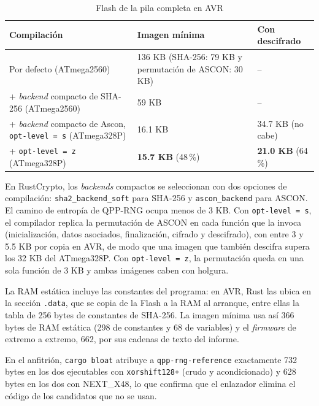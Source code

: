 \begin{table}[H]
\centering
\caption{Flash de la pila completa en AVR}
\label{tab:res_huella_avr}
\small
\begin{tabularx}{\textwidth}{@{}>{\raggedright\arraybackslash}XL{0.27\textwidth}L{0.24\textwidth}@{}}
\toprule
\textbf{Compilación} & \textbf{Imagen mínima} & \textbf{Con descifrado} \\
\midrule
Por defecto (ATmega2560) & 136 KB (SHA-256: 79 KB y permutación de ASCON: 30 KB) & -- \\
+ \textit{backend} compacto de SHA-256 (ATmega2560) & 59 KB & -- \\
+ \textit{backend} compacto de Ascon, \texttt{opt-level = \textquotedbl{}s\textquotedbl{}} (ATmega328P) & 16.1 KB & 34.7 KB (no cabe) \\
+ \texttt{opt-level = \textquotedbl{}z\textquotedbl{}} (ATmega328P) & \textbf{15.7 KB} (48\,\%) & \textbf{21.0 KB} (64\,\%) \\
\bottomrule
\end{tabularx}
\end{table}

En RustCrypto, los \textit{backends} compactos se seleccionan con dos opciones de compilación: \texttt{sha2\_backend\_soft} para SHA-256 y \texttt{ascon\_backend} para ASCON. El camino de entropía de QPP-RNG ocupa menos de 3 KB. Con \texttt{opt-level = \textquotedbl{}s\textquotedbl{}}, el compilador replica la permutación de ASCON en cada función que la invoca (inicialización, datos asociados, finalización, cifrado y descifrado), con entre 3 y 5.5 KB por copia en AVR, de modo que una imagen que también descifra supera los 32 KB del ATmega328P. Con \texttt{opt-level = \textquotedbl{}z\textquotedbl{}}, la permutación queda en una sola función de 3 KB y ambas imágenes caben con holgura.

La RAM estática incluye las constantes del programa: en AVR, Rust las ubica en la sección \texttt{.data}, que se copia de la Flash a la RAM al arranque, entre ellas la tabla de 256 bytes de constantes de SHA-256. La imagen mínima usa así 366 bytes de RAM estática (298 de constantes y 68 de variables) y el \textit{firmware} de extremo a extremo, 662, por sus cadenas de texto del informe.

En el anfitrión, \texttt{cargo bloat} atribuye a \texttt{qpp-rng-reference} exactamente 732 bytes en los dos ejecutables con \texttt{xorshift128+} (crudo y acondicionado) y 628 bytes en los dos con NEXT\_X48, lo que confirma que el enlazador elimina el código de los candidatos que no se usan.

